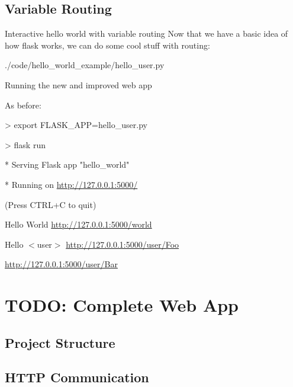 \documentclass{beamer}
\begin{document}
\subsection{Variable Routing}
	\begin{frame}[t]{Interactive hello world with variable routing}
		Now that we have a basic idea of how flask works, we can do some cool
		stuff with routing:
		\begin{block}{./code/hello\_world\_example/hello\_user.py}
			
		\end{block}
	\end{frame}

	\begin{frame}[t]{Running the new and improved web app}
		\begin{block}{As before:}
			\begin{semiverbatim}
				> export FLASK\_APP=hello\_user.py

				> flask run

				* Serving Flask app "hello\_world"

				* Running on \url{http://127.0.0.1:5000/}

					(Press CTRL+C to quit)
			\end{semiverbatim}
		\end{block}

		\begin{block}{Hello World}
			\url{http://127.0.0.1:5000/world}
		\end{block}
		\begin{block}{Hello $<$user$>$}
			\url{http://127.0.0.1:5000/user/Foo}

			\url{http://127.0.0.1:5000/user/Bar}
		\end{block}
	\end{frame}

\section{TODO: Complete Web App}

\subsection{Project Structure}

\subsection{HTTP Communication}
\end{document}
